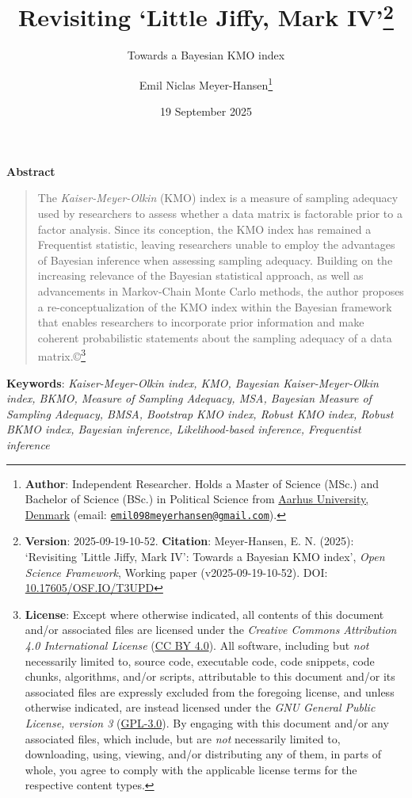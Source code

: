 \documentclass[
  10pt,
  a4paper,
  twoside]{article}
\title{Revisiting `Little Jiffy, Mark IV'\footnote{\textbf{Version}: 2025-09-19-10-52. \textbf{Citation}: Meyer-Hansen, E. N. (2025): `Revisiting 'Little Jiffy, Mark IV': Towards a Bayesian KMO index', \emph{Open Science Framework}, Working paper (v2025-09-19-10-52). DOI: \href{https://doi.org/10.17605/OSF.IO/T3UPD}{10.17605/OSF.IO/T3UPD}}}
\subtitle{Towards a Bayesian KMO index}
\author{Emil Niclas Meyer-Hansen\footnote{\textbf{Author}: Independent Researcher. Holds a Master of Science (MSc.) and Bachelor of Science (BSc.) in Political Science from \href{https://international.au.dk/}{Aarhus University, Denmark} (email: \href{mailto:emil098meyerhansen@gmail.com}{\nolinkurl{emil098meyerhansen@gmail.com}}).}}
\date{19 September 2025}
\renewenvironment{abstract} {\begin{center}\normalfont\large\bfseries Abstract\end{center}\vspace{-1em}\begin{quotation}\large} {\end{quotation}}
\begin{document}
\maketitle
\begin{abstract}
The \emph{Kaiser-Meyer-Olkin} (KMO) index is a measure of sampling adequacy used by researchers to assess whether a data matrix is factorable prior to a factor analysis. Since its conception, the KMO index has remained a Frequentist statistic, leaving researchers unable to employ the advantages of Bayesian inference when assessing sampling adequacy. Building on the increasing relevance of the Bayesian statistical approach, as well as advancements in Markov-Chain Monte Carlo methods, the author proposes a re-conceptualization of the KMO index within the Bayesian framework that enables researchers to incorporate prior information and make coherent probabilistic statements about the sampling adequacy of a data matrix.©\footnote{\textbf{License}: Except where otherwise indicated, all contents of this document and/or associated files are licensed under the \emph{Creative Commons Attribution 4.0 International License} (\href{https://creativecommons.org/licenses/by/4.0/}{CC BY 4.0}). All software, including but \emph{not} necessarily limited to, source code, executable code, code snippets, code chunks, algorithms, and/or scripts, attributable to this document and/or its associated files are expressly excluded from the foregoing license, and unless otherwise indicated, are instead licensed under the \emph{GNU General Public License, version 3} (\href{https://www.gnu.org/licenses/gpl-3.0.html}{GPL-3.0}). By engaging with this document and/or any associated files, which include, but are \emph{not} necessarily limited to, downloading, using, viewing, and/or distributing any of them, in parts of whole, you agree to comply with the applicable license terms for the respective content types.}
\end{abstract}

\newcommand{\dynamicdate}{19/09/2025}
\newcommand{\dynamicversion}{v2025-09-19-10-52}
\newcommand{\doiref}{DOI: 10.17605/OSF.IO/T3UPD}
\newcommand{\authorref}{Emil Niclas Meyer-Hansen}
\newcommand{\titleref}{Revisiting 'Little Jiffy, Mark IV'}
\newcommand{\subtitleref}{Towards a Bayesian KMO index}

\vspace{5em}

\textbf{Keywords}: \emph{Kaiser-Meyer-Olkin index, KMO, Bayesian Kaiser-Meyer-Olkin index, BKMO, Measure of Sampling Adequacy, MSA, Bayesian Measure of Sampling Adequacy, BMSA, Bootstrap KMO index, Robust KMO index, Robust BKMO index, Bayesian inference, Likelihood-based inference, Frequentist inference}
\end{document}
